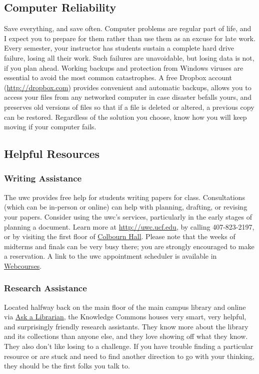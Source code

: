 \documentclass[11pt, twosides]{amsart}	%
\begin{document}
\subsection{Computer Reliability}\label{sub:reliability}
Save everything, and save often.  Computer problems are regular part of life, and I expect you to prepare for them rather than use them as an excuse for late work. Every semester, your instructor has students sustain a complete hard drive failure, losing all their work. Such failures are unavoidable, but losing data is not, if you plan ahead. Working backups and protection from Windows viruses are essential to avoid the most common catastrophes.  A free Dropbox account (\href{http://db.tt/mzWxY8s}{http://dropbox.com}) provides convenient and automatic backups, allows you to access your files from any networked computer in case disaster befalls yours, and preserves old versions of files so that if a file is deleted or altered, a previous copy can be restored. Regardless of the solution you choose, know how you will keep moving if your computer fails.

\subsection{Helpful Resources} %
\label{sub:helpful_resources}
\subsubsection{Writing Assistance}\label{ssub:uwc}
The \ac{uwc} provides free help for students writing papers for class.  Consultations (which can be in-person or online) can help with planning, drafting, or revising your papers.  Consider using the \ac{uwc}'s services, particularly in the early stages of planning a document.  Learn more at \href{http://uwc.ucf.edu/}{http://uwc.ucf.edu}, by calling 407-823-2197, or by visiting the first floor of \href{https://www.map.ucf.edu/locations/18/colbourn-hall/}{Colbourn Hall}.  Please note that the weeks of midterms and finals can be very busy there; you are strongly encouraged to make a reservation. A link to the \ac{uwc} appointment scheduler is available in \href{http://webcourses.instructure.com}{Webcourses}.

\subsubsection{Research Assistance} %
\label{ssub:knowledge_commons_in_the_library_}
Located halfway back on the main floor of the main campus library and online via \href{http://library.ucf.edu/Ask/}{Ask a Librarian}, the Knowledge Commons houses very smart, very helpful, and surprisingly friendly research assistants. They know more about the library and its collections than anyone else, and they love showing off what they know. They also don't like losing to a challenge. If you have trouble finding a particular resource or are stuck and need to find another direction to go with your thinking, they should be the first folks you talk to.
\end{document}
